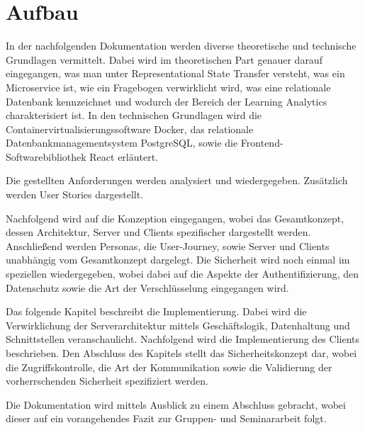 \section{Aufbau}

In der nachfolgenden Dokumentation werden diverse theoretische und technische Grundlagen vermittelt. Dabei wird im theoretischen Part genauer darauf eingegangen, was man unter Representational State Transfer versteht, was ein Microservice ist, wie ein Fragebogen verwirklicht wird, was eine relationale Datenbank kennzeichnet und wodurch der Bereich der Learning Analytics charakterisiert ist.
In den technischen Grundlagen wird die Containervirtualisierungssoftware Docker, das relationale Datenbankmanagementsystem PostgreSQL, sowie die Frontend-Softwarebibliothek React erläutert.
 
Die gestellten Anforderungen werden analysiert und wiedergegeben. Zusätzlich werden User Stories dargestellt.

Nachfolgend wird auf die Konzeption eingegangen, wobei das Gesamtkonzept, dessen Architektur, Server und Clients spezifischer dargestellt werden.
Anschließend werden Personas, die User-Journey, sowie Server und Clients unabhängig vom Gesamtkonzept dargelegt.
Die Sicherheit wird noch einmal im speziellen wiedergegeben, wobei dabei auf die Aspekte der Authentifizierung, den Datenschutz sowie die Art der Verschlüsselung eingegangen wird.

Das folgende Kapitel beschreibt die Implementierung. Dabei wird die Verwirklichung der Serverarchitektur mittels Geschäftslogik, Datenhaltung und Schnittstellen veranschaulicht. Nachfolgend wird die Implementierung des Clients beschrieben. Den Abschluss des Kapitels stellt das Sicherheitskonzept dar, wobei die Zugriffskontrolle, die Art der Kommunikation sowie die Validierung der vorherrschenden Sicherheit spezifiziert werden.

Die Dokumentation wird mittels Ausblick zu einem Abschluss gebracht, wobei dieser auf ein vorangehendes Fazit zur Gruppen- und Seminararbeit folgt.